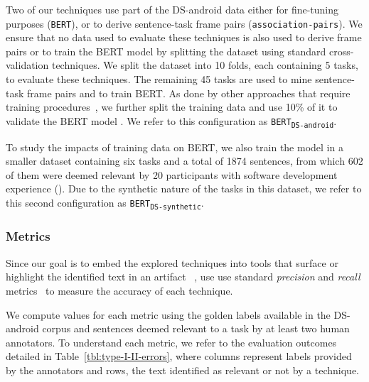 Two of our techniques use part of the  \acs{DS-android} data either for fine-tuning purposes (\texttt{BERT}), or to derive sentence-task frame pairs (\texttt{association-pairs}).
We ensure that no data used to evaluate these techniques is also used to derive frame pairs or to train the BERT model by 
splitting the dataset using standard cross-validation techniques.
We split the dataset into 10 folds, each containing 5 tasks, to evaluate these techniques. The remaining 45 tasks are used to mine sentence-task frame pairs
and to train BERT. As done by other approaches that require training procedures~\cite{Chaparro2017, fucci2019, Petrosyan2015}, we further split the training data and use 10\% of it to validate the BERT model .
We refer to this configuration as \texttt{BERT\textsubscript{DS-android}}.


To study the impacts of training data on BERT, we also train the model in a smaller dataset containing six tasks and a total of 1874 sentences, from which 602 of them were deemed relevant by 20 participants with software development experience (). Due to the synthetic nature of the tasks in this dataset, we refer to this 
second configuration as \texttt{BERT\textsubscript{DS-synthetic}}.




\subsubsection{Metrics}



Since our goal is to embed the explored techniques into tools that 
surface or highlight the identified text in an artifact ~\cite{Robillard2015}, 
use use standard \textit{precision} and \textit{recall} metrics~\cite{manning2010IR} to measure the accuracy of each technique.





We compute values for each metric using the golden labels available in the \acs{DS-android} corpus and sentences deemed relevant to a task by at least two human annotators. 
To understand each metric, we refer to the evaluation outcomes detailed in Table~\ref{tbl:type-I-II-errors}, where
 columns represent  labels provided by the annotators and rows,
the text identified as relevant or not by a technique.

\medskip




